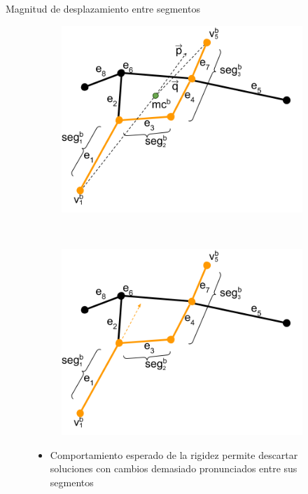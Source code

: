 \begin{frame}{Magnitud de desplazamiento entre segmentos}
    \begin{figure}[h]
    \centering
    \begin{subfigure}[t]{0.45\textwidth}
        \centering
        \includegraphics[scale=0.4]{Pictures/ant_segmentMagnitude_case.png}
    \end{subfigure}
    ~ \hspace{0.5cm}
    \begin{subfigure}[t]{0.45\textwidth}
        \centering
        \includegraphics[scale=0.4]{Pictures/ant_segmentMagnitude_case_2.png}
    \end{subfigure}%
    \begin{itemize}
        \item Comportamiento esperado de la rigidez permite descartar soluciones con cambios demasiado pronunciados entre sus segmentos
    \end{itemize}
\end{figure}
\end{frame}

